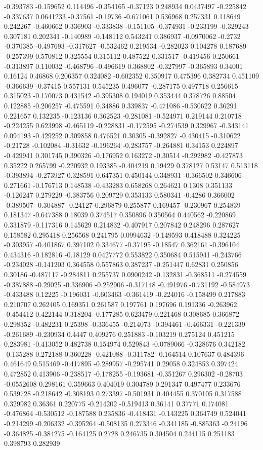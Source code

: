 -0.393783 -0.159652 0.114496 -0.354165 -0.37123 0.248934 0.0437497 -0.225842 -0.337637 0.0641233 -0.37561 -0.19736 -0.671061 0.536968 0.257331 0.118649 0.242267 -0.460662 0.336903 -0.333838 -0.151105 -0.374931 -0.233199 -0.329243 0.307181 0.202341 -0.140989 -0.148112 0.543241 0.386937 -0.0970062 -0.2732 -0.370385 -0.497693 -0.317627 -0.532462 0.219534 -0.282023 0.104278 0.187689 -0.257399 0.570812 0.325554 0.315112 0.487522 0.331517 -0.419456 0.250661 -0.313897 0.110032 -0.468796 -0.496619 0.368802 -0.327997 -0.365893 0.34001 0.16124 0.46868 0.206357 0.324082 -0.602352 0.350917 0.475396 0.382734 0.451109 -0.366639 -0.37415 0.557131 0.545235 0.496077 -0.287175 0.497718 0.256615 0.315023 -0.170073 0.431542 -0.395308 0.194019 0.353444 0.378726 0.88504 0.122885 -0.206257 -0.475591 0.34886 0.339837 -0.471086 -0.530622 0.36291 0.221657 0.132235 -0.123136 0.362523 -0.281081 -0.524971 0.219144 0.210718 -0.224255 0.623998 -0.465119 -0.228831 -0.172595 -0.274539 0.329967 -0.343141 0.094193 -0.429252 0.309858 0.476521 0.30305 -0.392827 -0.430415 -0.310622 -0.21728 -0.102084 -0.31632 -0.196264 -0.283757 -0.264881 0.34153 0.224897 -0.429941 0.301745 0.390326 -0.176952 0.163272 -0.30514 -0.292982 -0.427873 0.35222 0.265799 -0.220932 0.193385 -0.404219 0.19429 0.378127 0.53147 0.513118 -0.393894 -0.273927 0.328591 0.647351 0.450144 0.348931 -0.366502 0.346606 0.271661 -0.176713 0.148538 -0.433283 0.658268 0.264621 0.1308 0.351133 -0.126247 0.279229 -0.383756 0.209729 0.353133 0.580341 -0.4286 0.366002 -0.389507 -0.304887 -0.24127 0.296879 0.255877 0.169457 -0.230967 0.254839 0.181347 -0.647388 0.18039 0.374517 0.350896 0.350564 0.440562 -0.220869 0.331879 -0.117316 0.145629 0.214832 -0.407917 0.207842 0.248296 0.287627 0.158582 0.295418 0.256568 0.241795 0.0994632 -0.149593 0.418488 0.324225 -0.303957 -0.401867 0.397102 0.334677 -0.37195 -0.18547 0.362161 -0.396104 0.434316 -0.182816 -0.18129 0.0427772 0.553822 0.350684 0.515941 -0.243766 -0.234028 -0.141203 0.364558 0.557863 0.387237 -0.251447 0.62831 0.250856 0.30186 -0.487117 -0.284811 0.255737 0.0900242 -0.132831 -0.368511 -0.274559 -0.387888 -0.29025 -0.336906 -0.252906 -0.317148 -0.491976 -0.731192 -0.584973 -0.433488 0.12225 -0.196031 -0.603463 -0.361419 -0.224016 -0.158499 0.217883 0.210707 0.262405 0.169351 0.261587 0.197761 0.197696 0.191336 -0.263962 -0.454412 0.422144 0.318204 -0.177285 0.623479 0.221468 0.308685 0.366872 0.298352 -0.482231 0.25398 -0.336455 -0.214073 -0.394461 -0.466331 -0.221339 -0.261689 -0.230934 0.4447 0.409276 0.251883 -0.103219 0.275124 0.451215 0.283981 -0.413052 0.482738 0.154974 0.529843 -0.0789066 -0.328676 0.342182 -0.135288 0.272188 0.360228 -0.421088 -0.311782 -0.164514 0.107637 0.484396 0.461649 0.515469 -0.417895 -0.289957 -0.295741 0.29058 0.324853 0.397424 0.472852 0.413906 -0.238517 -0.178255 -0.193681 -0.351267 0.296302 -0.28703 -0.0552608 0.298161 0.359663 0.404019 0.304789 0.291347 0.497477 0.233676 0.539728 -0.218642 -0.308193 0.273397 -0.501931 0.404455 0.370105 0.317588 0.329982 0.36361 0.220775 -0.214202 -0.519413 0.36141 0.37771 0.174081 -0.476864 -0.530512 -0.187588 0.235836 -0.418431 -0.143225 0.364749 0.524041 -0.214299 -0.206332 -0.395264 -0.508135 0.273346 -0.341185 -0.885363 -0.24196 -0.364825 -0.384275 -0.164125 0.2728 0.246735 0.304504 0.244115 0.251183 0.398793 0.282939 